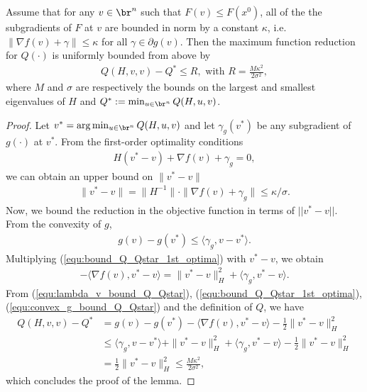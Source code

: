 \documentclass[11pt]{article}
\numberwithin{equation}{section}
\begin{document}
\begin{lemma}\label{lem:bound_Q_Qstar}
Assume  that for any  $v \in \br^n$ such that $F(v) \leq F(x^0)$, all of the the subgradients of $F$ at $v$ are bounded in norm by a constant $\kappa$, i.e. $\| \nabla f(v) + \gamma \| \leq \kappa $ for all $\gamma \in \partial g(v)$.  Then the maximum function reduction for $Q(\cdot)$ is uniformly bounded from above by 
\begin{align}
    \label{equ:bound_Q_Qstar}
    Q(H, v,v) - Q^* \leq R, \mbox{ with $R = \frac{M \kappa^2}{2 \sigma^2}$},
\end{align}
where $M$ and $\sigma$ are respectively the bounds on the largest and smallest eigenvalues of $H$ and $Q^* := \min_{u\in\br^n} Q(H, u,v)$.
\begin{proof}
    Let $v^*=\arg\min_{u\in\br^n} Q(H, u,v)$ and let $\gamma_g(v^*)$ be any subgradient of $g(\cdot)$ at $v^*$. From the first-order optimality conditions 
    \begin{align}
        \label{equ:bound_Q_Qstar_1st_optima}
        H(v^* - v) + \nabla f(v) + \gamma_g = 0,
    \end{align}
    we can obtain an upper bound on  $\|v^* - v\|$
    \begin{align}
        \|v^* - v\|
        = \|H^{-1}\| \cdot \| \nabla f(v) + \gamma_g \|\leq \kappa / \sigma.
    \end{align} 
    Now, we bound the reduction in the objective function  in terms of $||v^* - v||$. From the convexity of $g$,
    \begin{align}
        \label{equ:convex_g_bound_Q_Qstar}
        g(v) - g(v^*) \leq \langle \gamma_g, v - v^* \rangle.
    \end{align}
    Multiplying  (\ref{equ:bound_Q_Qstar_1st_optima}) with $v^* - v$, we obtain
    \begin{align}
        \label{equ:lambda_v_bound_Q_Qstar}
        -\langle \nabla f(v), v^* - v \rangle = \|v^* - v\|_H^2 + \langle \gamma_g, v^* - v \rangle.
    \end{align}
    From (\ref{equ:lambda_v_bound_Q_Qstar}), (\ref{equ:bound_Q_Qstar_1st_optima}),  (\ref{equ:convex_g_bound_Q_Qstar}) and the definition of $Q$, we have
    \begin{align}
        Q(H,v,v) - Q^* 
        &= g(v) - g(v^*) - \langle \nabla f(v), v^* - v \rangle - \frac{1}{2}\|v^* - v\|^2_H \nonumber \\
        \nonumber&\leq \langle \gamma_g, v - v^* \rangle + \|v^* - v\|_H^2 + \langle \gamma_g, v^* - v \rangle - \frac{1}{2}\|v^* - v\|^2_H \\
        \nonumber&= \frac{1}{2}\|v^* - v\|^2_H \leq \frac{M \kappa^2}{2 \sigma^2},
    \end{align}
    which concludes the proof of the lemma.
\end{proof}
\end{lemma}
\end{document}
